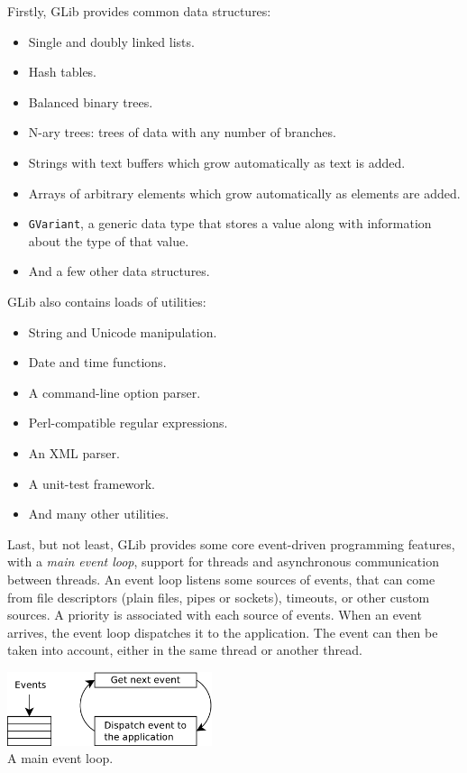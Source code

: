\documentclass[a4paper,notumble]{leaflet}
\begin{document}
Firstly, GLib provides common data structures:
\begin{itemize}
  \item Single and doubly linked lists.
  \item Hash tables.
  \item Balanced binary trees.
  \item N-ary trees: trees of data with any number of branches.
  \item Strings with text buffers which grow automatically as text is added.
  \item Arrays of arbitrary elements which grow automatically as elements are added.
  \item \texttt{GVariant}, a generic data type that stores a value along with information about the type of that value.
  \item And a few other data structures.
\end{itemize}

\bigskip
GLib also contains loads of utilities:
\begin{itemize}
  \item String and Unicode manipulation.
  \item Date and time functions.
  \item A command-line option parser.
  \item Perl-compatible regular expressions.
  \item An XML parser.
  \item A unit-test framework.
  \item And many other utilities.
\end{itemize}

\bigskip
Last, but not least, GLib provides some core event-driven programming features, with a \textit{main event loop}, support for threads and asynchronous communication between threads. An event loop listens some sources of events, that can come from file descriptors (plain files, pipes or sockets), timeouts, or other custom sources. A priority is associated with each source of events. When an event arrives, the event loop dispatches it to the application. The event can then be taken into account, either in the same thread or another thread.

\begin{center}
  \includegraphics[width=6cm]{images/event-loop.pdf}\\[0.2cm]
  A main event loop.
\end{center}
\end{document}
